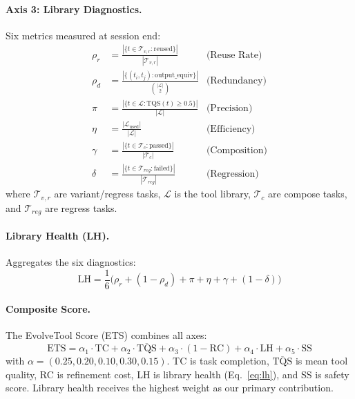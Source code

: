 \documentclass[]{ceurart}
\begin{document}
\paragraph{Axis 3: Library Diagnostics.} Six metrics measured at session end:
\begin{align}
\rho_r &= \frac{|\{t \in \mathcal{T}_{v,r} : \text{reused}\}|}{|\mathcal{T}_{v,r}|} & \text{(Reuse Rate)} \label{eq:reuse} \\[2pt]
\rho_d &= \frac{|\{(t_i,t_j) : \text{output\_equiv}\}|}{\binom{|\mathcal{L}|}{2}} & \text{(Redundancy)} \label{eq:redund} \\[2pt]
\pi &= \frac{|\{t \in \mathcal{L} : \text{TQS}(t) \geq 0.5\}|}{|\mathcal{L}|} & \text{(Precision)} \label{eq:prec} \\[2pt]
\eta &= \frac{|\mathcal{L}_{\text{used}}|}{|\mathcal{L}|} & \text{(Efficiency)} \label{eq:eff} \\[2pt]
\gamma &= \frac{|\{t \in \mathcal{T}_c : \text{passed}\}|}{|\mathcal{T}_c|} & \text{(Composition)} \label{eq:comp} \\[2pt]
\delta &= \frac{|\{t \in \mathcal{T}_{reg} : \text{failed}\}|}{|\mathcal{T}_{reg}|} & \text{(Regression)} \label{eq:reg}
\end{align}
where $\mathcal{T}_{v,r}$ are variant/regress tasks, $\mathcal{L}$ is the tool library, $\mathcal{T}_c$ are compose tasks, and $\mathcal{T}_{reg}$ are regress tasks.

\paragraph{Library Health (LH).} Aggregates the six diagnostics:
\begin{equation}
\text{LH} = \frac{1}{6}\bigl(\rho_r + (1{-}\rho_d) + \pi + \eta + \gamma + (1{-}\delta)\bigr)
\label{eq:lh}
\end{equation}

\paragraph{Composite Score.} The EvolveTool Score (ETS) combines all axes:
\begin{equation}
\text{ETS} = \alpha_1 \cdot \text{TC} + \alpha_2 \cdot \overline{\text{TQS}} + \alpha_3 \cdot (1{-}\text{RC}) + \alpha_4 \cdot \text{LH} + \alpha_5 \cdot \text{SS}
\label{eq:ets}
\end{equation}
with $\alpha = (0.25, 0.20, 0.10, 0.30, 0.15)$. TC is task completion, $\overline{\text{TQS}}$ is mean tool quality, RC is refinement cost, LH is library health (Eq.~\ref{eq:lh}), and SS is safety score. Library health receives the highest weight as our primary contribution.
\end{document}

